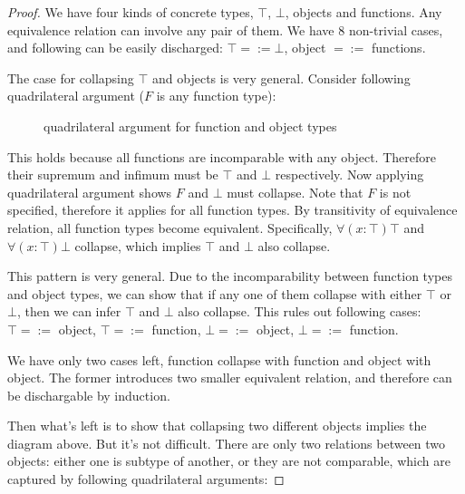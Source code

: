 \documentclass{article}
\theoremstyle{definition}
\begin{document}
\begin{proof}
  We have four kinds of concrete types, $\top$, $\bot$, objects and functions. Any
  equivalence relation can involve any pair of them. We have 8 non-trivial cases, and
  following can be easily discharged: $\top =:= \bot$, object $=:=$ functions.

  The case for collapsing $\top$ and objects is very general. Consider following
  quadrilateral argument ($F$ is any function type):
  
  \begin{figure}[H]
    \centering
    \caption{quadrilateral argument for function and object types}
  \end{figure}

  This holds because all functions are incomparable with any object. Therefore their
  supremum and infimum must be $\top$ and $\bot$ respectively. Now applying
  quadrilateral argument shows $F$ and $\bot$ must collapse. Note that $F$ is not
  specified, therefore it applies for all function types. By transitivity of
  equivalence relation, all function types become equivalent. Specifically,
  $\forall(x: \top)\top$ and $\forall(x: \top)\bot$ collapse, which implies $\top$ and
  $\bot$ also collapse.

  This pattern is very general. Due to the incomparability between function types and
  object types, we can show that if any one of them collapse with either $\top$ or
  $\bot$, then we can infer $\top$ and $\bot$ also collapse. This rules out following
  cases: $\top =:=$ object, $\top =:=$ function, $\bot =:=$ object, $\bot =:=$
  function.

  We have only two cases left, function collapse with function and object with
  object. The former introduces two smaller equivalent relation, and therefore can be
  dischargable by induction.

  Then what's left is to show that collapsing two different objects implies the
  diagram above. But it's not difficult. There are only two relations between two
  objects: either one is subtype of another, or they are not comparable, which are
  captured by following quadrilateral arguments:


\end{proof}
\end{document}
